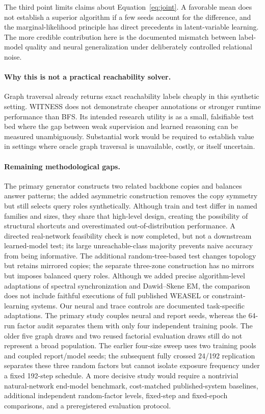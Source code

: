 \documentclass[10pt]{article}
\begin{document}
The third point limits claims about Equation~\ref{eq:joint}. A favorable mean does not establish a superior algorithm if a few seeds account for the difference, and the marginal-likelihood principle has direct precedents in latent-variable learning. The more credible contribution here is the documented mismatch between label-model quality and neural generalization under deliberately controlled relational noise.

\paragraph{Why this is not a practical reachability solver.} Graph traversal already returns exact reachability labels cheaply in this synthetic setting. WITNESS does not demonstrate cheaper annotations or stronger runtime performance than BFS. Its intended research utility is as a small, falsifiable test bed where the gap between weak supervision and learned reasoning can be measured unambiguously. Substantial work would be required to establish value in settings where oracle graph traversal is unavailable, costly, or itself uncertain.

\paragraph{Remaining methodological gaps.} The primary generator constructs two related backbone copies and balances answer patterns; the added asymmetric construction removes the copy symmetry but still selects query roles synthetically. Although train and test differ in named families and sizes, they share that high-level design, creating the possibility of structural shortcuts and overestimated out-of-distribution performance. A directed real-network feasibility check is now completed, but not a downstream learned-model test; its large unreachable-class majority prevents naive accuracy from being informative. The additional random-tree-based test changes topology but retains mirrored copies; the separate three-zone construction has no mirrors but imposes balanced query roles. Although we added precise algorithm-level adaptations of spectral synchronization and Dawid--Skene EM, the comparison does not include faithful executions of full published WEASEL or constraint-learning systems. Our neural and trace controls are documented task-specific adaptations. The primary study couples neural and report seeds, whereas the 64-run factor audit separates them with only four independent training pools. The older five graph draws and two reused factorial evaluation draws still do not represent a broad population. The earlier four-size sweep uses two training pools and coupled report/model seeds; the subsequent fully crossed 24/192 replication separates these three random factors but cannot isolate exposure frequency under a fixed 192-step schedule. A more decisive study would require a nontrivial natural-network end-model benchmark, cost-matched published-system baselines, additional independent random-factor levels, fixed-step and fixed-epoch comparisons, and a preregistered evaluation protocol.
\end{document}
